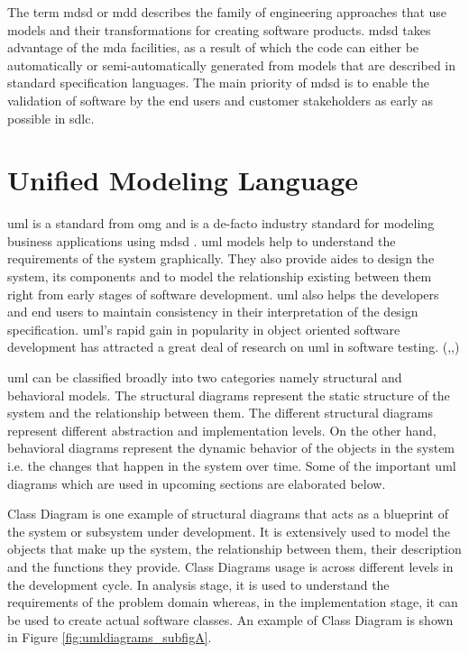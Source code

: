 The term \gls{mdsd} or \gls{mdd} describes the family of engineering approaches that use models and their transformations for creating software products. \gls{mdsd} takes advantage of the \gls{mda} facilities, as a result of which the code can either be automatically or semi-automatically generated from models that are described in standard specification languages. The main priority of \gls{mdsd} is to enable the validation of software by the end users and customer stakeholders as early as possible in \gls{sdlc}.



\section{Unified Modeling Language} \label{secuml}
\gls{uml} is a standard from \gls{omg} and is a de-facto industry standard for modeling business applications using \gls{mdsd} \cite{cerny2015separation}. \gls{uml} models help to understand the requirements of the system graphically. They also provide aides to design the system, its components and to model the relationship existing between them right from early stages of software development. \gls{uml} also helps the developers and end users to maintain consistency in their interpretation of the design specification. \gls{uml}’s rapid gain in popularity in object oriented software development has attracted a great deal of research on \gls{uml} in software testing. (\cite{nebut2003requirements},\cite{badri2003use},\cite{nebut2003requirements})

\gls{uml} can be classified broadly into two categories namely structural and behavioral models. The structural diagrams represent the static structure of the system and the relationship between them. The different structural diagrams represent different abstraction and implementation levels. On the other hand, behavioral diagrams represent the dynamic behavior of the objects in the system i.e. the changes that happen in the system over time. Some of the important \gls{uml} diagrams which are used in upcoming sections are elaborated below.

Class Diagram is one example of structural diagrams that acts as a blueprint of the system or subsystem under development. It is extensively used to model the objects that make up the system, the relationship between them, their description and the functions they provide. Class Diagrams usage is across different levels in the development cycle. In analysis stage, it is used to understand the requirements of the problem domain whereas, in the implementation stage, it can be used to create actual software classes. An example of Class Diagram is shown in Figure \ref{fig:umldiagrams_subfigA}.

